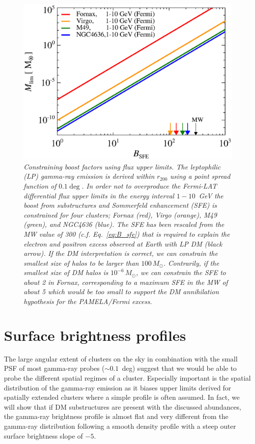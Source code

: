 \documentclass[10pt,aps,pra,reprint,amsmath,amsfonts,amssymb,showpacs,nofootinbib,floatfix]{revtex4-1}
\newcommand{\msun}{M_\odot}
\newcommand{\rvir}{r_{200}}
\begin{document}
\begin{figure}%
 \includegraphics[width=0.99\columnwidth]{figures/LP.const.diff.v12.0.1deg.1.6T.SubMass.SF300.IR2.noMW.woGal.eps}
 \caption{\it Constraining boost factors using flux upper limits. The
   leptophilic (LP) gamma-ray emission is derived within $\rvir$ using
   a point spread function of $0.1\deg$. In order not to overproduce
   the Fermi-LAT differential flux upper limits in the energy interval
   $1-10$~GeV the boost from substructures and Sommerfeld enhancement
   (SFE) is constrained for four clusters; Fornax (red), Virgo
   (orange), M49 (green), and NGC4636 (blue). The SFE has been
   rescaled from the MW value of 300 (c.f. Eq.~\ref{eq:B_sfe}) that is
   required to explain the electron and positron excess observed at
   Earth with LP DM (black arrow). If the DM interpretation is
   correct, we can constrain the smallest size of halos to be larger
   than $100\,\msun$. Contrarily, if the smallest size of DM halos is
   $10^{-6}\,\msun$, we can constrain the SFE to about 2 in Fornax,
   corresponding to a maximum SFE in the MW of about 5 which would be
   too small to support the DM annihilation hypothesis for the
   PAMELA/Fermi excess.}
 \label{fig:boost_const}
\end{figure}



\section{Surface brightness profiles}
\label{sect:spatial}

The large angular extent of clusters on the sky in combination with
the small PSF of most gamma-ray probes ($\sim 0.1$~deg) suggest that
we would be able to probe the different spatial regimes of a
cluster. Especially important is the spatial distribution of the
gamma-ray emission as it biases upper limits derived for spatially
extended clusters where a simple profile is often assumed. In fact, we
will show that if DM substructures are present with the discussed
abundances, the gamma-ray brightness profile is almost flat and very
different from the gamma-ray distribution following a smooth density
profile with a steep outer surface brightness slope of $-5$.
\end{document}
